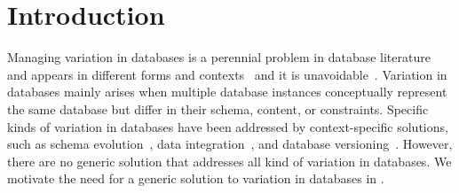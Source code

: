 \chapter{Introduction}
\label{ch:intro}

%

Managing variation in databases is a perennial problem in database literature
and appears in different forms and 
contexts~\cite{curateVdata,ALW21vamos,ready17cidr,clams16sigmod,datahub15cidr}
and it is unavoidable~\cite{dbDecay16Stonebraker}.
%
Variation in databases mainly arises when multiple database instances 
conceptually represent the same database but differ
in their schema, content, or constraints.
%
Specific kinds of variation in databases have been addressed by 
context-specific solutions, such as
schema evolution~\cite{SchEvolRA90McKenzie, 
schVersioning97Castro, tempSchEvol91Ariav, tsql95Snodgrass, 
prima08Moon}, 
data integration~\cite{dataIntegBook}, 
and database versioning~\cite{datasetVersioning,dbVersioning}.
%
However, there are no generic solution that addresses all kind of variation
in databases. We motivate the need for a generic solution to variation
in databases in .
%



